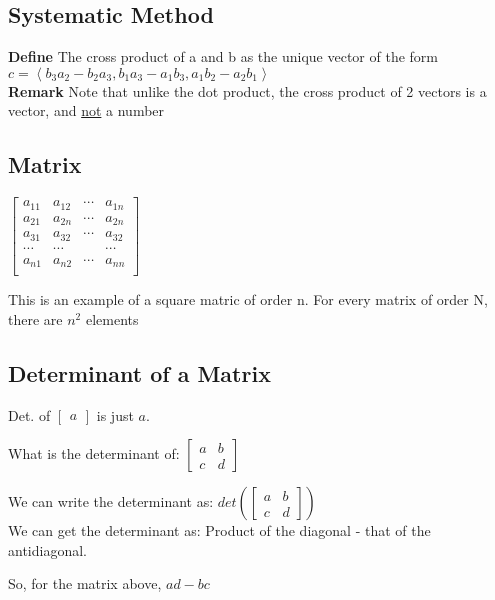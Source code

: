 \documentclass[]{article}
\begin{document}
    \subsection*{Systematic Method}
    \textbf{Define} The cross product of a and b as the unique vector of the form $ c=\left\langle b_3a_2-b_2a_3, b_1a_3-a_1b_3, a_1b_2-a_2b_1\right\rangle $\\
    \textbf{Remark} Note that unlike the dot product, the cross product of 2 vectors is a vector, and \underline{not} a number 

    \subsection*{Matrix}
    $ \begin{bmatrix}
        a_{11} & a_{12} & \cdots & a_{1n} \\
        a_{21} & a_{2n} & \cdots & a_{2n} \\
        a_{31} & a_{32} & \cdots & a_{32} \\
        \cdots & \cdots &  & \cdots\\
        a_{n1} & a_{n2} & \cdots & a_{nn}\\
        \end{bmatrix}  $

        This is an example of a square matric of order n.
        For every matrix of order N, there are $n^2$ elements
    \subsection*{Determinant of a Matrix}
    Det. of $\begin{bmatrix} a \end{bmatrix}$ is just $a$.
    
    What is the determinant of:
    $\begin{bmatrix}
        a&b\\c&d
    \end{bmatrix}
    $

    We can write the determinant as:
    $
    det(\begin{bmatrix}
        a&b\\c&d
    \end{bmatrix})
    $\\
    We can get the determinant as: Product of the diagonal - that of the antidiagonal.

    So, for the matrix above, $ad - bc$
\end{document}
